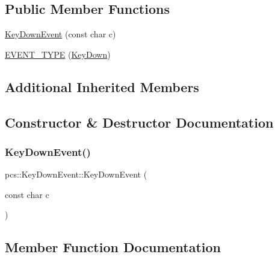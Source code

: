 \subsection*{Public Member Functions}
\begin{DoxyCompactItemize}
\item 
\hyperlink{classpcs_1_1KeyDownEvent_a66a843037aace9bed5e3be68b2eab56c}{Key\+Down\+Event} (const char c)
\item 
\hyperlink{classpcs_1_1KeyDownEvent_ae2f1f9e6fb979f79c1f97ca16226fbab}{E\+V\+E\+N\+T\+\_\+\+T\+Y\+PE} (\hyperlink{namespacepcs_a12954f53e3d7d6a8765fd723e1ce8db4acfd07bf1effd88bca04a12a087777354}{Key\+Down})
\end{DoxyCompactItemize}
\subsection*{Additional Inherited Members}


\subsection{Constructor \& Destructor Documentation}
\mbox{\label{classpcs_1_1KeyDownEvent_a66a843037aace9bed5e3be68b2eab56c}} 
\subsubsection{\texorpdfstring{Key\+Down\+Event()}{KeyDownEvent()}}
{\footnotesize\ttfamily pcs\+::\+Key\+Down\+Event\+::\+Key\+Down\+Event (\begin{DoxyParamCaption}\item[{const char}]{c }\end{DoxyParamCaption})\hspace{0.3cm}{\ttfamily [inline]}}



\subsection{Member Function Documentation}
\mbox{\label{classpcs_1_1KeyDownEvent_ae2f1f9e6fb979f79c1f97ca16226fbab}} 
